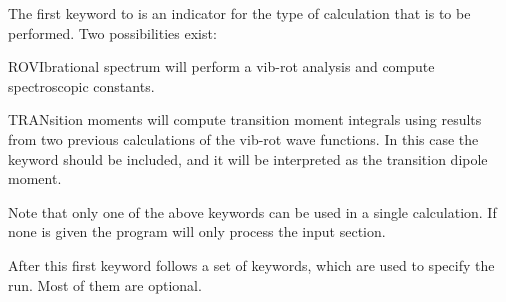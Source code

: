 The first keyword to
 is an indicator for the type of calculation
that is to be performed. Two possibilities exist:
\begin{keywordlist}
\item[ROVIbrational spectrum]
 will perform a vib-{}rot analysis and compute
spectroscopic constants.
\item[TRANsition moments]
 will compute transition moment integrals
using results from two previous calculations of the vib-{}rot wave
functions. In this case the keyword  should be
included, and it will be interpreted as the transition dipole moment.
\end{keywordlist}
Note that only one of the above keywords can be used in a single
calculation. If none is given the program will only process the input
section.

After this first keyword follows a set of keywords, which are used to
specify the run. Most of them are optional.

